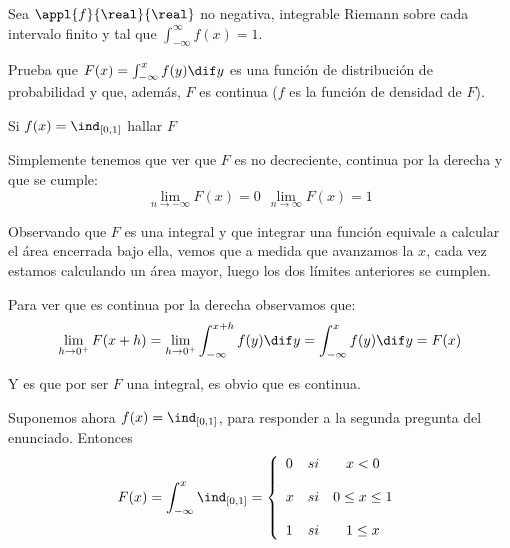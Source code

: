 \begin{problem}
Sea $\appl{f}{\real}{\real}$ no negativa, integrable Riemann sobre cada intervalo finito y tal que $\int_{-\infty}^{\infty}f(x)=1$.

Prueba que $F(x)=\int_{-\infty}^x f(y) \dif y$ es una función de distribución de probabilidad y que, además, $F$ es continua ($f$ es la función de densidad de $F$).

Si $f(x)=\ind_{[0,1]}$ hallar $F$

\solution
Simplemente tenemos que ver que $F$ es no decreciente, continua por la derecha y que se cumple:
\[\lim_{n \to - \infty}F(x)=0 \ \ \lim_{n \to \infty}F(x)=1\]

Observando que $F$ es una integral y que integrar una función equivale a calcular el área encerrada bajo ella, vemos que a medida que avanzamos la $x$, cada vez estamos calculando un área mayor, luego los dos límites anteriores se cumplen.

Para ver que es continua por la derecha observamos que:
\[ \lim_{h \to 0^+}F(x+h) = \lim_{h \to 0^+} \int_{-\infty}^{x+h}f(y)\dif y = \int_{-\infty}^xf(y)\dif y = F(x)\]

Y es que por ser $F$ una integral, es obvio que es continua.

Suponemos ahora $f(x)=\ind_{[0,1]}$, para responder a la segunda pregunta del enunciado. Entonces
\[F(x)= \int_{-\infty}^{x} \ind_{[0,1]} = \left\{ \begin{array}{lcc}
             0 &   si  & x < 0 \\
             \\ x & si &  0 \leq x \leq 1 \\
             \\ 1 &  si  & 1 \leq x
             \end{array}
   \right.\]
\end{problem}

